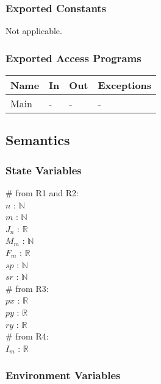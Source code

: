 \documentclass[12pt, titlepage]{article}
\begin{document}
\subsubsection{Exported Constants}
Not applicable.

\subsubsection{Exported Access Programs}

\begin{center}
\begin{tabular}{p{2cm} p{4cm} p{4cm} p{2cm}}
\hline
\textbf{Name} & \textbf{In} & \textbf{Out} & \textbf{Exceptions} \\
\hline
Main & - & - & - \\
\hline
\end{tabular}
\end{center}

\subsection{Semantics}

\subsubsection{State Variables}
$\#$ from R1 and R2:\\
$n$ : $\mathbb{N}$ \\
$m$ : $\mathbb{N}$ \\
$J_n$ : $\mathbb{R}$ \\
$M_m$ : $\mathbb{N}$ \\
$F_m$ : $\mathbb{R}$ \\
$sp$ : $\mathbb{N}$ \\
$sr$ : $\mathbb{N}$ \\
\newline
$\#$ from R3:\\
$px$ : $\mathbb{R}$ \\
$py$ : $\mathbb{R}$ \\
$ry$ : $\mathbb{R}$ \\
\newline
$\#$ from R4:\\
$I_m$ : $\mathbb{R}$ \\

\subsubsection{Environment Variables}
\end{document}
